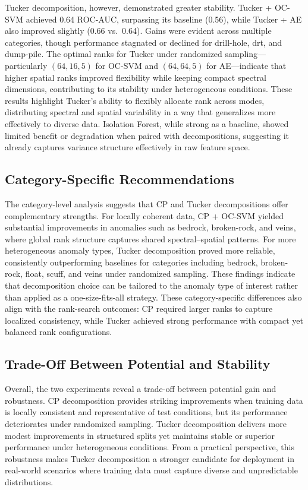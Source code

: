 \documentclass[pdflatex,sn-mathphys-ay]{sn-jnl}
\begin{document}
Tucker decomposition, however, demonstrated greater stability. Tucker + OC-SVM achieved 0.64 ROC-AUC, surpassing its baseline (0.56), while Tucker + AE also improved slightly (0.66 vs.\ 0.64). Gains were evident across multiple categories, though performance stagnated or declined for drill-hole, drt, and dump-pile. The optimal ranks for Tucker under randomized sampling—particularly \((64,16,5)\) for OC-SVM and \((64,64,5)\) for AE—indicate that higher spatial ranks improved flexibility while keeping compact spectral dimensions, contributing to its stability under heterogeneous conditions. These results highlight Tucker’s ability to flexibly allocate rank across modes, distributing spectral and spatial variability in a way that generalizes more effectively to diverse data. Isolation Forest, while strong as a baseline, showed limited benefit or degradation when paired with decompositions, suggesting it already captures variance structure effectively in raw feature space.  

\subsection{Category-Specific Recommendations}

The category-level analysis suggests that CP and Tucker decompositions offer complementary strengths. For locally coherent data, CP + OC-SVM yielded substantial improvements in anomalies such as bedrock, broken-rock, and veins, where global rank structure captures shared spectral–spatial patterns. For more heterogeneous anomaly types, Tucker decomposition proved more reliable, consistently outperforming baselines for categories including bedrock, broken-rock, float, scuff, and veins under randomized sampling. These findings indicate that decomposition choice can be tailored to the anomaly type of interest rather than applied as a one-size-fits-all strategy. These category-specific differences also align with the rank-search outcomes: CP required larger ranks to capture localized consistency, while Tucker achieved strong performance with compact yet balanced rank configurations.  

\subsection{Trade-Off Between Potential and Stability}

Overall, the two experiments reveal a trade-off between potential gain and robustness. CP decomposition provides striking improvements when training data is locally consistent and representative of test conditions, but its performance deteriorates under randomized sampling. Tucker decomposition delivers more modest improvements in structured splits yet maintains stable or superior performance under heterogeneous conditions. From a practical perspective, this robustness makes Tucker decomposition a stronger candidate for deployment in real-world scenarios where training data must capture diverse and unpredictable distributions.  
\end{document}
